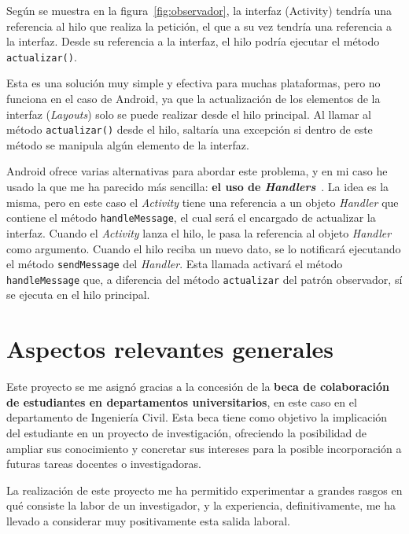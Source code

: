 Según se muestra en la figura~\ref{fig:observador}, la interfaz (Activity) tendría una referencia al hilo que realiza la petición, el que a su vez tendría una referencia a la interfaz. Desde su referencia a la interfaz, el hilo podría ejecutar el método \texttt{actualizar()}.

Esta es una solución muy simple y efectiva para muchas plataformas, pero no funciona en el caso de Android, ya que la actualización de los elementos de la interfaz (\textit{Layouts}) solo se puede realizar desde el hilo principal. Al llamar al método \texttt{actualizar()} desde el hilo, saltaría una excepción si dentro de este método se manipula algún elemento de la interfaz. 

Android ofrece varias alternativas para abordar este problema, y en mi caso he usado la que me ha parecido más sencilla: \textbf{el uso de \textit{Handlers}}~\cite{handler}. La idea es la misma, pero en este caso el \textit{Activity} tiene una referencia a un objeto \textit{Handler} que contiene el método \texttt{handleMessage}, el cual será el encargado de actualizar la interfaz. Cuando el \textit{Activity} lanza el hilo, le pasa la referencia al objeto \textit{Handler} como argumento. Cuando el hilo reciba un nuevo dato, se lo notificará ejecutando el método \texttt{sendMessage} del \textit{Handler}. Esta llamada activará el método \texttt{handleMessage} que, a diferencia del método \texttt{actualizar} del patrón observador, sí se ejecuta en el hilo principal. 

\section{Aspectos relevantes generales}

Este proyecto se me asignó gracias a la concesión de la \textbf{beca de colaboración de estudiantes en departamentos universitarios}, en este caso en el departamento de Ingeniería Civil. Esta beca tiene como objetivo la implicación del estudiante en un proyecto de investigación, ofreciendo la posibilidad de ampliar sus conocimiento y concretar sus intereses para la posible incorporación a futuras tareas docentes o investigadoras. 

La realización de este proyecto me ha permitido experimentar a grandes rasgos en qué consiste la labor de un investigador, y la experiencia, definitivamente, me ha llevado a considerar muy positivamente esta salida laboral. 


